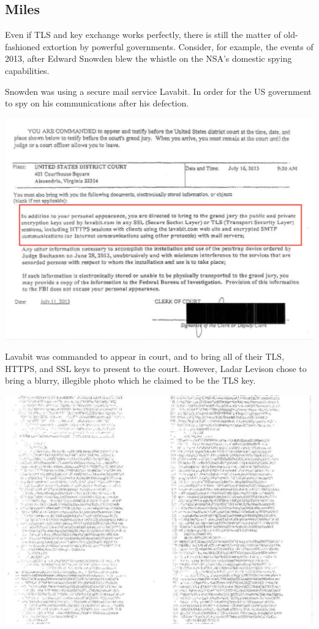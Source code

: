 \documentclass[11pt]{article} %
\begin{document}
\subsection{Miles}
Even if TLS and key exchange works perfectly, there is still the matter of old-fashioned extortion by powerful governments. Consider, for example, the events of 2013, after Edward Snowden blew the whistle on the NSA's domestic spying capabilities.

Snowden was using a secure mail service Lavabit. In order for the US government to spy on his communications after his defection.

\includegraphics[scale=.3]{./lavabit-summons.png}

Lavabit was commanded to appear in court, and to bring all of their TLS, HTTPS, and SSL keys to present to the court. However, Ladar Levison chose to bring a blurry, illegible photo which he claimed to be the TLS key.

\includegraphics[scale=.3]{./lavabit-blurry-key.png}
\end{document}
